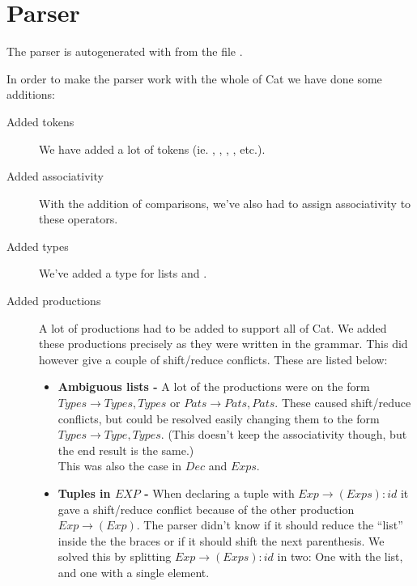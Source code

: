 \chapter{Parser}
The parser is autogenerated with  from the file 
.

In order to make the parser work with the whole of Cat we have done some
additions:

\begin{description}
\item [Added tokens] We have added a lot of tokens (ie. ,
        , , , etc.).
\item [Added associativity] With the addition of comparisons, we've also had
        to assign associativity to these operators.
\item [Added types] We've added a type for  lists and
        .
\item [Added productions] A lot of productions had to be added to support all
        of Cat. We added these productions precisely as they were written in
        the grammar. This did however give a couple of shift/reduce conflicts.
        These are listed below:
        \begin{itemize}
        \item \textbf{Ambiguous lists -} A lot of the productions were on the
                form $Types \to Types , Types$ or $Pats \to Pats , Pats$.
                These caused shift/reduce conflicts, but could be resolved
                easily changing them to the form $Types \to Type , Types$.
                (This doesn't keep the associativity though, but the end result
                is the same.)\\
                This was also the case in $Dec$ and $Exps$.
        \item \textbf{Tuples in $EXP$ -} When declaring a tuple with
                $Exp \to ( Exps ) : id$ it gave a shift/reduce conflict because
                of the other production $Exp\to ( Exp )$. The parser didn't
                know if it should reduce the ``list'' inside the the braces or
                if it should shift the next parenthesis. We solved this by
                splitting $Exp \to ( Exps ) : id$ in two: One with the list,
                and one with a single element.
        \end{itemize}
\end{description}

